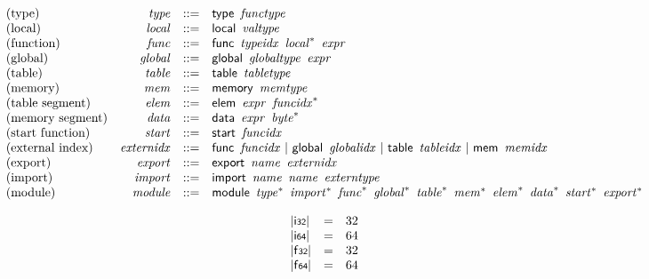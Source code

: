 $$
\begin{array}{@{}lrrl@{}l@{}}
\mbox{(type)} & {\mathit{type}} &::=& \mathsf{type}~\,{\mathit{functype}} \\
\mbox{(local)} & {\mathit{local}} &::=& \mathsf{local}~\,{\mathit{valtype}} \\
\mbox{(function)} & {\mathit{func}} &::=& \mathsf{func}~\,{\mathit{typeidx}}~\,{{\mathit{local}}^\ast}~\,{\mathit{expr}} \\
\mbox{(global)} & {\mathit{global}} &::=& \mathsf{global}~\,{\mathit{globaltype}}~\,{\mathit{expr}} \\
\mbox{(table)} & {\mathit{table}} &::=& \mathsf{table}~\,{\mathit{tabletype}} \\
\mbox{(memory)} & {\mathit{mem}} &::=& \mathsf{memory}~\,{\mathit{memtype}} \\
\mbox{(table segment)} & {\mathit{elem}} &::=& \mathsf{elem}~\,{\mathit{expr}}~\,{{\mathit{funcidx}}^\ast} \\
\mbox{(memory segment)} & {\mathit{data}} &::=& \mathsf{data}~\,{\mathit{expr}}~\,{{\mathit{byte}}^\ast} \\
\mbox{(start function)} & {\mathit{start}} &::=& \mathsf{start}~\,{\mathit{funcidx}} \\
\mbox{(external index)} & {\mathit{externidx}} &::=& \mathsf{func}~\,{\mathit{funcidx}} ~|~ \mathsf{global}~\,{\mathit{globalidx}} ~|~ \mathsf{table}~\,{\mathit{tableidx}} ~|~ \mathsf{mem}~\,{\mathit{memidx}} \\
\mbox{(export)} & {\mathit{export}} &::=& \mathsf{export}~\,{\mathit{name}}~\,{\mathit{externidx}} \\
\mbox{(import)} & {\mathit{import}} &::=& \mathsf{import}~\,{\mathit{name}}~\,{\mathit{name}}~\,{\mathit{externtype}} \\
\mbox{(module)} & {\mathit{module}} &::=& \mathsf{module}~\,{{\mathit{type}}^\ast}~\,{{\mathit{import}}^\ast}~\,{{\mathit{func}}^\ast}~\,{{\mathit{global}}^\ast}~\,{{\mathit{table}}^\ast}~\,{{\mathit{mem}}^\ast}~\,{{\mathit{elem}}^\ast}~\,{{\mathit{data}}^\ast}~\,{{\mathit{start}}^\ast}~\,{{\mathit{export}}^\ast} \\
\end{array}
$$

\vspace{1ex}

\vspace{1ex}

\vspace{1ex}

$$
\begin{array}{@{}lcl@{}l@{}}
{|\mathsf{i{\scriptstyle32}}|} &=& 32 &  \\
{|\mathsf{i{\scriptstyle64}}|} &=& 64 &  \\
{|\mathsf{f{\scriptstyle32}}|} &=& 32 &  \\
{|\mathsf{f{\scriptstyle64}}|} &=& 64 &  \\
\end{array}
$$


